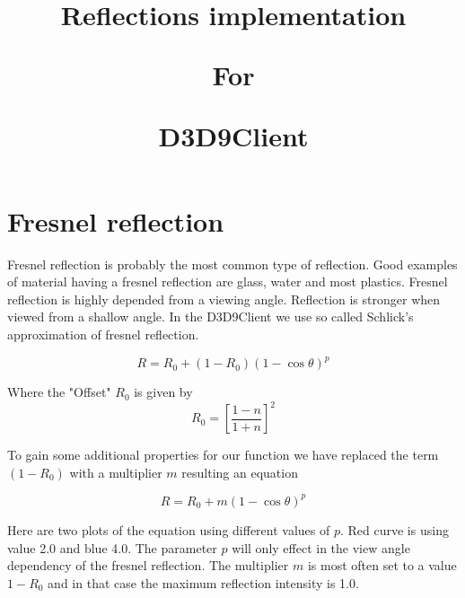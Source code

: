 \documentclass[twocolumn]{report}
\newenvironment{twocol}[0]{%
\begin{list}{}{%
\onecolumn
\setlength{\leftmargin}{0.15cm}%
\setlength{\rightmargin}{0.15cm}%
\setlength{\topmargin}{0cm}%
\setlength{\headheight}{0cm}%
\setlength{\headsep}{0cm}%
\setlength{\textheight}{24cm}%
}%
\item[]}{\end{list}}
\begin{document}
\title{
\begin{center}
\textbf{Reflections implementation}\end{center}
\begin{center}
\textbf{For}\end{center}
\begin{center}
\textbf{D3D9Client}\end{center}
\vspace{-2cm}
}

\maketitle

\begin{twocol}

\section*{Fresnel reflection}

Fresnel reflection is probably the most common type of reflection. Good examples of material having a fresnel reflection are glass, water and most plastics. Fresnel reflection is highly depended from a viewing angle. Reflection is stronger when viewed from a shallow angle. In the D3D9Client we use so called Schlick's approximation of fresnel reflection. 

\begin{equation}
 R = R_0 + (1-R_0)(1-\cos\theta)^p
\end{equation}

Where the "Offset" $R_0$ is given by
\begin{equation}
R_0 = \left[\frac{1-n}{1+n}\right]^2
\end{equation}

To gain some additional properties for our function we have replaced the term $(1-R_0)$ with a multiplier $m$ resulting an equation

\begin{equation}
 R = R_0 + m(1-\cos\theta)^p
\end{equation}

Here are two plots of the equation using different values of $p$. Red curve is using value 2.0 and blue 4.0. The parameter $p$ will only effect in the view angle dependency of the fresnel reflection. The multiplier $m$ is most often set to a value $1-R_0$ and in that case the maximum reflection intensity is 1.0.


\end{twocol}
\end{document}
